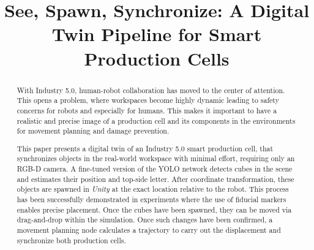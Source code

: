 \documentclass{bmvc2k}
\title{See, Spawn, Synchronize: A Digital Twin Pipeline for Smart Production Cells}
\begin{document}
\maketitle

\begin{abstract}
With Industry 5.0, human-robot collaboration has moved to the center of attention. This opens a problem, where workspaces become highly dynamic leading to safety concerns for robots and especially for humans. This makes it important to have a realistic and precise image of a production cell and its components in the environments for movement planning and damage prevention.

This paper presents a digital twin of an Industry 5.0 smart production cell, that synchronizes objects in the real-world workspace with minimal effort, requiring only an RGB-D camera. A fine-tuned version of the YOLO network detects cubes in the scene and estimates their position and top-side letter. After coordinate transformation, these objects are spawned in \textit{Unity} at the exact location relative to the robot. This process has been successfully demonstrated in experiments where the use of fiducial markers enables precise placement. Once the cubes have been spawned, they can be moved via drag-and-drop within the simulation. Once such changes have been confirmed, a movement planning node calculates a trajectory to carry out the displacement and synchronize both production cells.




\end{abstract}

\end{document}
